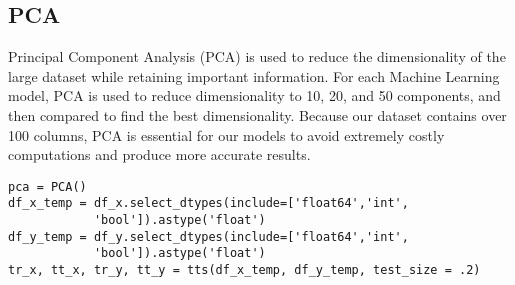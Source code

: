 \documentclass{article}
\begin{document}
\hypertarget{pca}{%
	\subsection{PCA}\label{pca}}

Principal Component Analysis (PCA) is used to reduce the dimensionality of the
large dataset while retaining important information. For each Machine
Learning model, PCA is used to reduce dimensionality to 10, 20, and 50
components, and then compared to find the best dimensionality. Because
our dataset contains over 100 columns, PCA is essential for our models
to avoid extremely costly computations and produce more accurate
results.

\begin{lstlisting}
pca = PCA()
df_x_temp = df_x.select_dtypes(include=['float64','int',
            'bool']).astype('float')
df_y_temp = df_y.select_dtypes(include=['float64','int',
            'bool']).astype('float')
tr_x, tt_x, tr_y, tt_y = tts(df_x_temp, df_y_temp, test_size = .2)


\end{lstlisting}
\end{document}
